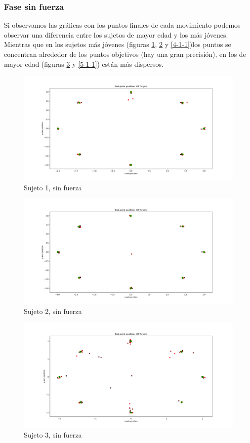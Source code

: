\documentclass[a4paper,11pt, oneside]{book}
\begin{document}
\subsubsection{Fase sin fuerza}
Si observamos las gráficas con los puntos finales de cada movimiento podemos observar una diferencia entre los sujetos de mayor edad y los más jóvenes. Mientras que en los sujetos más jóvenes (figuras \ref{1-1-1}, \ref{2-1-1} y \ref{4-1-1})los puntos se concentran alrededor de los puntos objetivos (hay una gran precisión), en los de mayor edad (figuras \ref{3-1-1} y \ref{5-1-1}) están más dispersos.

\begin{figure}[H]
	\centering
	\includegraphics[width=\linewidth]{sujeto1/no_force/trayectorias_puntos}
	\caption{Sujeto 1, sin fuerza}
	\label{1-1-1}
\end{figure}
\begin{figure}[H]
	\centering
	\includegraphics[width=\linewidth]{sujeto2/no_force/trayectorias_puntos}
	\caption{Sujeto 2, sin fuerza}
	\label{2-1-1}
\end{figure}
\begin{figure}[H]
	\centering
	\includegraphics[width=\linewidth]{sujeto3/no_force/trayectorias_puntos}
	\caption{Sujeto 3, sin fuerza}
	\label{3-1-1}
\end{figure}
\end{document}
